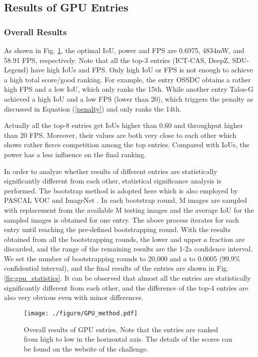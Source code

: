 \documentclass[10pt,journal,compsoc]{IEEEtran}
\begin{document}
\subsection{Results of GPU Entries}

\subsubsection{Overall Results}

As shown in Fig. \ref{fig:GPU_method}, the optimal IoU, power and FPS are 0.6975, 4834mW, and 58.91 FPS, respectively.
Note that all the top-3 entries (ICT-CAS, DeepZ, SDU-Legend) have high IoUs and FPS.
Only high IoU or FPS is not enough to achieve a high total score/good ranking.
For example, the entry OSSDC obtains a rather high FPS and a low IoU, which only ranks the 15th.
While another entry Talos-G achieved a high IoU and a low FPS (lower than 20), which triggers the penalty as discussed in Equation (\ref{penalty}) and only ranks the 14th.

Actually all the top-8 entries get IoUs higher than 0.60 and throughput higher than 20 FPS.
Moreover, their values are both very close to each other which shows rather fierce competition among the top entries.
Compared with IoUs, the power has a less influence on the final ranking.

In order to analyze whether results of different entries are statistically significantly different from each other, statistical significance analysis is performed.
The bootstrap method is adopted here which is also employed by PASCAL VOC \cite{everingham2010pascal} and ImageNet \cite{russakovsky2015imagenet}.
In each bootstrap round, M images are sampled with replacement from the available M testing images and the average IoU for the sampled images is obtained for one entry.
The above process iterates for each entry until reaching the pre-defined bootstrapping round.
With the results obtained from all the bootstrapping rounds, the lower and upper $a$ fraction are discarded, and the range of the remaining results are the 1-2a confidence interval.
We set the number of bootstrapping rounds to 20,000 and $a$ to 0.0005 (99.9\% confidential interval), and the final results of the entries are shown in Fig. \ref{fig:gpu_statistics}.
It can be observed that almost all the entries are statistically significantly different from each other, and the difference of the top-4 entries are also very obvious even with minor differences.

\begin{figure}
\centering
  \texttt{[image: ./figure/GPU\_method.pdf]}
  \caption{Overall results of GPU entries. Note that the entries are ranked from high to low in the horizontal axis. The details of the scores can be found on the website of the challenge.}
  \label{fig:GPU_method}
\end{figure}
\end{document}
